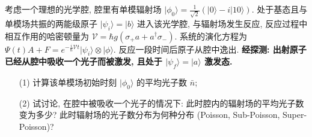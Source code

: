 \documentclass{assignment}
\begin{document}
\begin{prob}[20 分]
    考虑一个理想的光学腔, 腔里有单模辐射场 $\lvert\phi_0\rangle=\frac{1}{\sqrt{2}}(\lvert 0\rangle-i\lvert 10\rangle)$. 处于基态且与单模场共振的两能级原子 $\lvert\psi_i\rangle=\lvert b\rangle$ 进入该光学腔, 与辐射场发生反应, 反应过程中相互作用的哈密顿量为 $\mathscr{V}=\hbar g(\sigma_+a+a^{\dagger}\sigma_-)$. 系统的演化方程为 $\Psi(t){A+F}=e^{-\frac{i}{\hbar}\mathscr{V}t}\lvert\psi_i\rangle\otimes\lvert\phi\rangle$. 反应一段时间后原子从腔中逸出. \textbf{经探测: 出射原子已经从腔中吸收一个光子而被激发, 且处于 $\lvert\psi_f\rangle=\lvert a\rangle$ 激发态.}
    \begin{itemize}
        \item[(1)] 计算该单模场初始时刻 $\lvert\phi_0\rangle$ 的平均光子数 $\bar{n}$;
        \item[(2)] 试讨论, 在腔中被吸收一个光子的情况下: 此时腔内的辐射场的平均光子数变为多少? 此时辐射场的光子数分布为何种分布 (Poisson, Sub-Poisson, Super-Poisson)?
    \end{itemize}
\end{prob}
\end{document}
